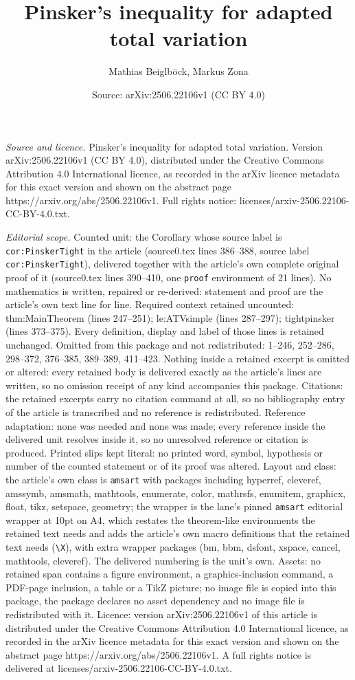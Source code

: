 \documentclass[10pt,a4paper]{amsart}
\title[Pinsker's inequality for adapted total variation]{Pinsker's inequality for adapted total variation}
\author{Mathias Beiglb\"ock, Markus Zona}
\date{Source: arXiv:2506.22106v1 (CC BY 4.0)}
\begin{document}
\maketitle

\noindent\emph{Source and licence.} Pinsker's inequality for adapted total variation. Version arXiv:2506.22106v1 (CC BY 4.0), distributed under the Creative Commons Attribution 4.0 International licence, as recorded in the arXiv licence metadata for this exact version and shown on the abstract page https://arxiv.org/abs/2506.22106v1. Full rights notice: licenses/arxiv-2506.22106-CC-BY-4.0.txt.\par\smallskip

\noindent\textit{Editorial scope.} Counted unit: the Corollary whose source label is \texttt{cor:PinskerTight} in the article (source0.tex lines 386--388, source label \texttt{cor:PinskerTight}), delivered together with the article's own complete original proof of it (source0.tex lines 390--410, one \texttt{proof} environment of 21 lines). No mathematics is written, repaired or re-derived: statement and proof are the article's own text line for line. Required context retained uncounted: thm:MainTheorem (lines 247--251); le:ATVsimple (lines 287--297); tightpinsker (lines 373--375). Every definition, display and label of those lines is retained unchanged. Omitted from this package and not redistributed: 1--246, 252--286, 298--372, 376--385, 389--389, 411--423. Nothing inside a retained excerpt is omitted or altered: every retained body is delivered exactly as the article's lines are written, so no omission receipt of any kind accompanies this package. Citations: the retained excerpts carry no citation command at all, so no bibliography entry of the article is transcribed and no reference is redistributed. Reference adaptation: none was needed and none was made; every reference inside the delivered unit resolves inside it, so no unresolved reference or citation is produced. Printed slips kept literal: no printed word, symbol, hypothesis or number of the counted statement or of its proof was altered. Layout and class: the article's own class is \texttt{amsart} with packages including hyperref, cleveref, amssymb, amsmath, mathtools, enumerate, color, mathrsfs, enumitem, graphicx, float, tikz, setspace, geometry; the wrapper is the lane's pinned \texttt{amsart} editorial wrapper at 10pt on A4, which restates the theorem-like environments the retained text needs and adds the article's own macro definitions that the retained text needs (\texttt{\textbackslash X}), with extra wrapper packages (bm, bbm, dsfont, xspace, cancel, mathtools, cleveref). The delivered numbering is the unit's own. Assets: no retained span contains a figure environment, a graphics-inclusion command, a PDF-page inclusion, a table or a TikZ picture; no image file is copied into this package, the package declares no asset dependency and no image file is redistributed with it. Licence: version arXiv:2506.22106v1 of this article is distributed under the Creative Commons Attribution 4.0 International licence, as recorded in the arXiv licence metadata for this exact version and shown on the abstract page https://arxiv.org/abs/2506.22106v1. A full rights notice is delivered at licenses/arxiv-2506.22106-CC-BY-4.0.txt. 
\end{document}
